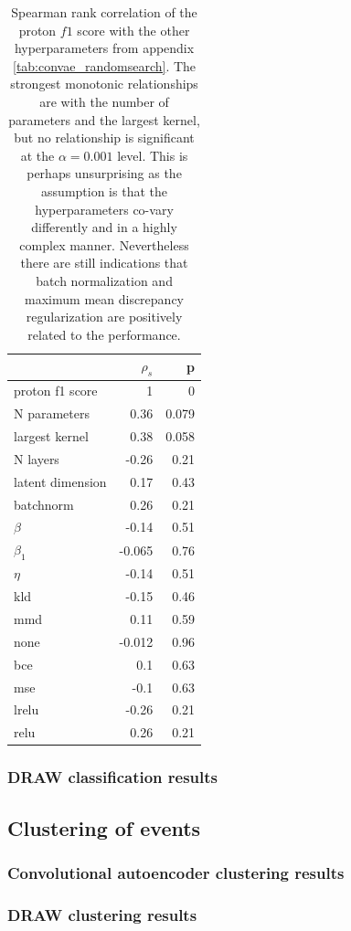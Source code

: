 \begin{table}
\centering
\begin{tabular}{lrr}
\toprule
{} &  $\rho_s$ &     p \\
\midrule
proton f1 score  &         1 &     0 \\
N parameters     &      0.36 & 0.079 \\
largest kernel   &      0.38 & 0.058 \\
N layers         &     -0.26 &  0.21 \\
latent dimension &      0.17 &  0.43 \\
batchnorm        &      0.26 &  0.21 \\
$\beta$          &     -0.14 &  0.51 \\
$\beta_1$        &    -0.065 &  0.76 \\
$\eta$           &     -0.14 &  0.51 \\
kld              &     -0.15 &  0.46 \\
mmd              &      0.11 &  0.59 \\
none             &    -0.012 &  0.96 \\
bce              &       0.1 &  0.63 \\
mse              &      -0.1 &  0.63 \\
lrelu            &     -0.26 &  0.21 \\
relu             &      0.26 &  0.21 \\
\bottomrule
\end{tabular}
\caption{Spearman rank correlation of the proton $f1$ score with the other hyperparameters from appendix \ref{tab:convae_randomsearch}. The strongest monotonic relationships are with the number of parameters and the largest kernel, but no relationship is significant at the $\alpha = 0.001$ level. This is perhaps unsurprising as the assumption is that the hyperparameters co-vary differently and in a highly complex manner. Nevertheless there are still indications that batch normalization and maximum mean discrepancy regularization are positively related to the performance.}\label{tab:hyperparam_corr}
\end{table}

\subsubsection{DRAW classification results}

\subsection{Clustering of events}
\subsubsection{Convolutional autoencoder clustering results}
\subsubsection{DRAW clustering results}
